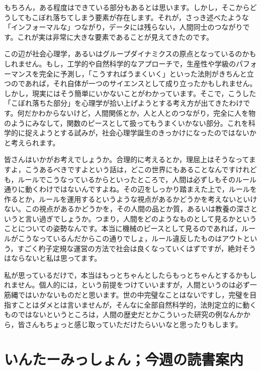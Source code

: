 \documentclass{ltjsbook}
\begin{document}
もちろん，ある程度はできている部分もあるとは思います。しかし，そこからどうしてもこぼれ落ちてしまう要素が存在します。それが，さっき述べたような「インフォーマルな」つながり，データには残らない，人間同士のつながりです。これが実は非常に大きな要素であることが見えてきたのです。

この辺が社会心理学，あるいはグループダイナミクスの原点となっているのかもしれません。もし，工学的や自然科学的なアプローチで，生産性や学級のパフォーマンスを完全に予測し，「こうすればうまくいく」といった法則がきちんと立つのであれば，それ自体が一つのサイエンスとして成り立ったかもしれません。しかし，現実にはそう簡単にいかないことがわかっています。そこで，こうした「こぼれ落ちた部分」を心理学が拾い上げようとする考え方が出てきたわけです。何だかわからないけど，人間関係とか，人と人とのつながり，完全に人を物のようにみなして，関数のピースとして扱ってもうまくいかない部分。これを科学的に捉えようとする試みが，社会心理学誕生のきっかけになったのではないかと考えられます。

皆さんはいかがお考えでしょうか。合理的に考えるとか，理屈上はそうなってますよ，こうあるべきですよという話は，どこの世界にもあることなんですけれども，ルールでこうなっているからといったところで，人間は必ずしもそのルール通りに動くわけではないんですよね。その辺をしっかり踏まえた上で，ルールを作るとか，ルールを運用するというような視点があるかどうかを考えないといけない。この視点があるかどうかを，その人間の品とか質，あるいは教養の深さというと言い過ぎでしょうか。つまり，人間をどのようなものとして見るかということについての姿勢なんです。本当に機械のピースとして見るのであれば，ルールがこうなっているんだからこの通りでしょ，ルール違反したものはアウトという，すごく杓子定規な運営の方法で社会は良くなっていくはずですが，絶対そうはならないと私は思ってます。

私が思っているだけで，本当はもっとちゃんとしたらもっとちゃんとするかもしれません。個人的には，という前提をつけていいますが，人間というのは必ず一筋縄ではいかないものだと思います。世の中完璧なことはないですし，完璧を目指すことはダメとは言いませんが，そんなに全部自然科学的，法則定立的に動くものではないというところは，人間の歴史だとかこういった研究の例なんかから，皆さんもちょっと感じ取っていただけたらいいなと思ったりもします。

\section{いんたーみっしょん；今週の読書案内}
\end{document}
